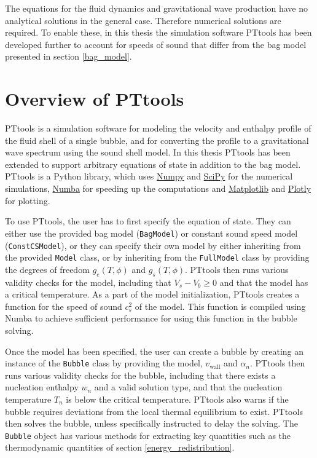 The equations for the fluid dynamics and gravitational wave production have no analytical solutions in the general case.
Therefore numerical solutions are required.
To enable these, in this thesis the simulation software PTtools has been developed further to account for speeds of sound that differ from the bag model presented in section \ref{bag_model}.


\section{Overview of PTtools}
PTtools is a simulation software for modeling the velocity and enthalpy profile of the fluid shell of a single bubble,
and for converting the profile to a gravitational wave spectrum using the sound shell model.
In this thesis PTtools has been extended to support arbitrary equations of state in addition to the bag model.
PTtools is a Python library, which uses
\href{https://numpy.org/}{Numpy}
and
\href{https://scipy.org/}{SciPy}
for the numerical simulations,
\href{https://numba.pydata.org/}{Numba}
for speeding up the computations and
\href{https://matplotlib.org/}{Matplotlib}
and
\href{https://plotly.com/}{Plotly}
for plotting.

To use PTtools, the user has to first specify the equation of state.
They can either use the provided bag model (\texttt{BagModel}) or constant sound speed model (\texttt{ConstCSModel}),
or they can specify their own model by either inheriting from the provided \texttt{Model} class,
or by inheriting from the \texttt{FullModel} class by providing the degrees of freedom $g_e(T,\phi)$ and $g_s(T,\phi)$.
PTtools then runs various validity checks for the model,
including that $V_s - V_b \geq 0$ and that the model has a critical temperature.
As a part of the model initialization, PTtools creates a function for the speed of sound $c_s^2$ of the model.
This function is compiled using Numba to achieve sufficient performance for using this function in the bubble solving.

Once the model has been specified,
the user can create a bubble by creating an instance of the \texttt{Bubble} class by providing the model, $v_\text{wall}$ and $\alpha_n$.
PTtools then runs various validity checks for the bubble,
including that there exists a nucleation enthalpy $w_n$ and a valid solution type,
and that the nucleation temperature $T_n$ is below the critical temperature.
PTtools also warns if the bubble requires deviations from the local thermal equilibrium to exist.
PTtools then solves the bubble, unless specifically instructed to delay the solving.
The \texttt{Bubble} object has various methods for extracting key quantities such as the thermodynamic quantities of section \ref{energy_redistribution}.

